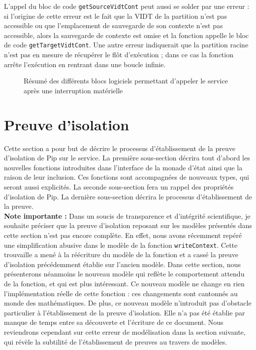 		L'appel du bloc de code \texttt{getSourceVidtCont} peut aussi se solder par une erreur : si l'origine de cette erreur est le fait que la VIDT de la partition n'est pas accessible ou que l'emplacement de sauvegarde de son contexte n'est pas accessible, alors la sauvegarde de contexte est omise et la fonction appelle le bloc de code \texttt{getTargetVidtCont}. Une autre erreur indiquerait que la partition racine n'est pas en mesure de récupérer le flôt d'exécution ; dans ce cas la fonction arrête l'exécution en rentrant dans une boucle infinie.

		\begin{figure}[!ht]
			\centering
			
			\caption{Résumé des différents blocs logiciels permettant d'appeler le service après une interruption matérielle}
			\label{fig:interrupt_software}
		\end{figure}

	\section{Preuve d'isolation}

		Cette section a pour but de décrire le processus d'établissement de la preuve d'isolation de Pip sur le service. La première sous-section décrira tout d'abord les nouvelles fonctions introduites dans l'interface de la monade d'état ainsi que la raison de leur inclusion. Ces fonctions sont accompagnées de nouveaux types, qui seront aussi explicités. La seconde sous-section fera un rappel des propriétés d'isolation de Pip. La dernière sous-section décrira le processus d'établissement de la preuve.\\

		\textbf{Note importante :} Dans un soucis de transparence et d'intégrité scientifique, je souhaite préciser que la preuve d'isolation reposant sur les modèles présentés dans cette section n'est pas encore complète. En effet, nous avons récemment repéré une simplification abusive dans le modèle de la fonction \texttt{writeContext}. Cette trouvaille a mené à la réécriture du modèle de la fonction et a cassé la preuve d'isolation précédemment établie sur l'ancien modèle. Dans cette section, nous présenterons néanmoins le nouveau modèle qui reflète le comportement attendu de la fonction, et qui est plus intéressant. Ce nouveau modèle ne change en rien l'implémentation réelle de cette fonction : ces changements sont cantonnés au monde des mathématiques. De plus, ce nouveau modèle n'introduit pas d'obstacle particulier à l'établissement de la preuve d'isolation. Elle n'a pas été établie par manque de temps entre sa découverte et l'écriture de ce document. Nous reviendrons cependant sur cette erreur de modélisation dans la section suivante, qui révèle la subtilité de l'établissement de preuves au travers de modèles.

